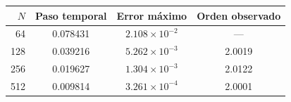 \begin{tabular}{rccc}
\toprule
$N$ & Paso temporal & Error máximo & Orden observado \\
\midrule
64 & 0.078431 & $2.108\times10^{-2}$ & --- \\
128 & 0.039216 & $5.262\times10^{-3}$ & 2.0019 \\
256 & 0.019627 & $1.304\times10^{-3}$ & 2.0122 \\
512 & 0.009814 & $3.261\times10^{-4}$ & 2.0001 \\
\bottomrule
\end{tabular}
